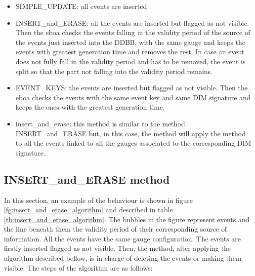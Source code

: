 \begin{itemize}
\item SIMPLE\_UPDATE: all events are inserted
\item INSERT\_and\_ERASE: all the events are inserted but flagged as not visible. Then the \acrshort{eboa} checks the events falling in the validity period of the source of the events just inserted into the DDBB, with the same gauge and keeps the events with greatest generation time and removes the rest. In case an event does not fully fall in the validity period and has to be removed, the event is split so that the part not falling into the validity period remains.
\item EVENT\_KEYS: the events are inserted but flagged as not visible. Then the \acrshort{eboa} checks the events with the same event key and same DIM signature and keeps the ones with the greatest generation time.
\item insert\_and\_erase: this method is similar to the method INSERT\_and\_ERASE but, in this case, the method will apply the method to all the events linked to all the gauges associated to the corresponding DIM signature.
\end{itemize}

\subsection {INSERT\_and\_ERASE method}

In this section, an example of the behaviour is shown in figure \ref{fg:insert_and_erase_algorithm} and described in table \ref{tb:insert_and_erase_algorithm}. The bubbles in the figure represent events and the line beneath them the validity period of their corresponding source of information. All the events have the same gauge configuration.
The events are firstly inserted flagged as not visible. Then, the method, after applying the algorithm described bellow, is in charge of deleting the events or making them visible.
The steps of the algorithm are as follows:

